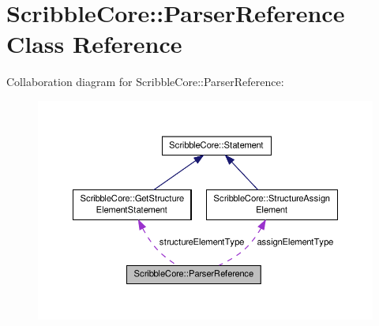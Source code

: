 \hypertarget{class_scribble_core_1_1_parser_reference}{\section{Scribble\-Core\-:\-:Parser\-Reference Class Reference}
\label{class_scribble_core_1_1_parser_reference}
}


Collaboration diagram for Scribble\-Core\-:\-:Parser\-Reference\-:\nopagebreak
\begin{figure}[H]
\begin{center}
\leavevmode
\includegraphics[width=350pt]{class_scribble_core_1_1_parser_reference__coll__graph}
\end{center}
\end{figure}
